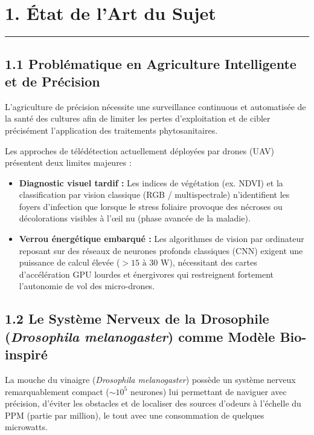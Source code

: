 \documentclass[11pt,a4paper]{article}
\begin{document}
\section*{\color{primaryblue}1. État de l'Art du Sujet}
\hrule
\vspace{0.3cm}

\subsection*{\color{secondarygreen}1.1 Problématique en Agriculture Intelligente et de Précision}
L'agriculture de précision nécessite une surveillance continuous et automatisée de la santé des cultures afin de limiter les pertes d'exploitation et de cibler précisément l'application des traitements phytosanitaires.

Les approches de télédétection actuellement déployées par drones (UAV) présentent deux limites majeures :
\begin{itemize}
    \item \textbf{Diagnostic visuel tardif :} Les indices de végétation (ex. NDVI) et la classification par vision classique (RGB / multispectrale) n'identifient les foyers d'infection que lorsque le stress foliaire provoque des nécroses ou décolorations visibles à l'œil nu (phase avancée de la maladie).
    \item \textbf{Verrou énergétique embarqué :} Les algorithmes de vision par ordinateur reposant sur des réseaux de neurones profonds classiques (CNN) exigent une puissance de calcul élevée ($> 15\text{ à }30\text{ W}$), nécessitant des cartes d'accélération GPU lourdes et énergivores qui restreignent fortement l'autonomie de vol des micro-drones.
\end{itemize}

\subsection*{\color{secondarygreen}1.2 Le Système Nerveux de la Drosophile (\textit{Drosophila melanogaster}) comme Modèle Bio-inspiré}
La mouche du vinaigre (\textit{Drosophila melanogaster}) possède un système nerveux remarquablement compact ($\sim 10^5$ neurones) lui permettant de naviguer avec précision, d'éviter les obstacles et de localiser des sources d'odeurs à l'échelle du PPM (partie par million), le tout avec une consommation de quelques microwatts.
\end{document}
